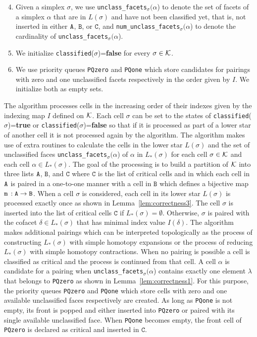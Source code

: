 \documentclass[12pt]{article}
\newcommand{\cK}{{\cal K}}
\newcommand{\ma}{\texttt{m}\,} \newcommand{\re}{\texttt{r}\,}
\newcommand{\sB}{\texttt{B}}
\newcommand{\sC}{\texttt{C}} \newcommand{\sD}{\texttt{D}} \newcommand{\sM}{\texttt{M}} \newcommand{\sL}{\texttt{L}}
\begin{document}
\begin{enumerate}\setcounter{enumi}{3}
\item Given a simplex $\sigma$, we use \texttt{{unclass}\_{facets}}$_{\sigma}(\alpha$)
to denote the set of facets of a simplex $\alpha$ that are
in $L(\sigma)$ and have not been classified yet, that is, not inserted
in either $\texttt{A}$, $\sB$, or $\sC$, and \texttt{{num}\_{unclass}\_{facets}}$_{\sigma}(\alpha$) to denote the cardinality of
\texttt{{unclass}\_{facets}}$_{\sigma}(\alpha$).

\item We initialize \texttt{classified}($\sigma$)={\bf false}
for every $\sigma\in \cK$.

\item We use priority queues \texttt{PQzero} and \texttt{PQone}
which store candidates for pairings with zero and one unclassified
facets respectively in the order given by $I$. We initialize both as empty sets.
\end{enumerate}

The algorithm processes cells in the increasing order of their indexes given by the indexing map $I$ defined on $\cK$. Each cell $\sigma$ can be set to the states
of \texttt{classified}($\sigma$)={\bf true} or \texttt{classified}($\sigma$)={\bf false} so that if it is processed as part of a lower star of another cell it is not
processed again by the algorithm. The algorithm makes use of extra routines to calculate the cells in the lower star $L(\sigma)$ and the set of unclassified
faces \texttt{{unclass}\_{facets}}$_{\sigma}(\alpha$) of $\alpha$ in $L_*(\sigma)$ for each cell $\sigma \in \cK$ and each cell $\alpha \in L_*(\sigma)$.
The goal of the processing is to build a partition of $\cK$ into three lists $\texttt{A}$, $\sB$, and $\sC$ where $\sC$ is the list
of critical cells and in which each cell in $\texttt{A}$ is paired in a one-to-one manner with a cell in $\sB$ which defines a bijective map $\ma:\sA\to \sB$.
When a cell $\sigma$ is considered, each cell in its lower star $L(\sigma)$ is processed exactly once as shown in Lemma~\ref{lem:correctness3}. The cell $\sigma$ is inserted into the list of critical cells $\sC$ if $L_* (\sigma) = \emptyset$. Otherwise,
$\sigma$ is paired with the cofacet $\delta \in L_* (\sigma)$ that has minimal index value $I(\delta)$. The algorithm makes additional pairings which can be
interpreted topologically as the process of
constructing $L_*(\sigma)$ with simple homotopy expansions or the process of reducing $L_*(\sigma)$ with simple homotopy contractions.
When no pairing is possible a  cell is classified as critical and the
process is continued from that cell. A cell $\alpha$ is candidate for a pairing when \texttt{{unclass}\_{facets}}$_{\sigma}(\alpha$) contains exactly one element $\lambda$ that belongs to \texttt{PQzero} as shown in Lemma~\ref{lem:correctness1}. For this purpose, the priority queues \texttt{PQzero} and \texttt{PQone} which store cells with zero and
one available unclassified faces respectively are created. As long as \texttt{PQone} is not empty, its front is popped and either inserted into \texttt{PQzero} or paired with its single available unclassified face. When \texttt{PQone} becomes empty, the front cell of \texttt{PQzero} is declared as critical and inserted in $\sC$.
\end{document}
